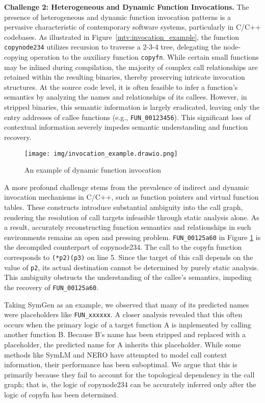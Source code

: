 \documentclass[acmsmall,screen,review,anonymous]{acmart} %
\begin{document}
\textbf{Challenge 2: Heterogeneous and Dynamic Function Invocations.}
The presence of heterogeneous and dynamic function invocation patterns is a pervasive characteristic of contemporary software systems, particularly in C/C++ codebases. As illustrated in Figure~\ref{mtv:invocation_example}, the function \lstinline{copynode234} utilizes recursion to traverse a 2-3-4 tree, delegating the node-copying operation to the auxiliary function \lstinline{copyfn}. While certain small functions may be inlined during compilation, the majority of complex call relationships are retained within the resulting binaries, thereby preserving intricate invocation structures. At the source code level, it is often feasible to infer a function’s semantics by analyzing the names and relationships of its callees. However, in stripped binaries, this semantic information is largely eradicated, leaving only the entry addresses of callee functions (e.g., \lstinline{FUN_00123456}). This significant loss of contextual information severely impedes semantic understanding and function recovery.


\begin{figure}[h] %
    \centering
    \texttt{[image: img/invocation\_example.drawio.png]} %
    \caption{An example of dynamic function invocation} %
    \label{fig:invocation_example} %
\end{figure}

A more profound challenge stems from the prevalence of indirect and dynamic invocation mechanisms in C/C++, such as function pointers and virtual function tables. These constructs introduce substantial ambiguity into the call graph, rendering the resolution of call targets infeasible through static analysis alone. As a result, accurately reconstructing function semantics and relationships in such environments remains an open and pressing problem. \lstinline{FUN_00125a60} in Figure \ref{fig:invocation_example} is the decompiled counterpart of copynode234. The call to the copyfn function corresponds to \lstinline{(*p2)(p3)} on line 5. Since the target of this call depends on the value of \lstinline{p2}, its actual destination cannot be determined by purely static analysis. This ambiguity obstructs the understanding of the callee's semantics, impeding the recovery of \lstinline{FUN_00125a60}.

Taking SymGen\cite{SymGen} as an example, we observed that many of its predicted names were placeholders like \lstinline{FUN_xxxxxx}. A closer analysis revealed that this often occurs when the primary logic of a target function A is implemented by calling another function B. Because B's name has been stripped and replaced with a placeholder, the predicted name for A inherits this placeholder. While some methods like SymLM\cite{SymLM} and NERO\cite{NERO} have attempted to model call context information, their performance has been suboptimal. We argue that this is primarily because they fail to account for the topological dependency in the call graph; that is, the logic of copynode234 can be accurately inferred only after the logic of copyfn has been determined.
\end{document}
